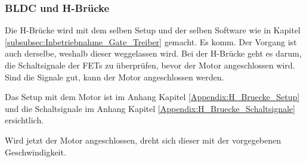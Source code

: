 \subsubsection{BLDC und H-Brücke}
\label{subsubsec:Inbetriebnahme_BLDC_und_H-Brücke}


Die H-Brücke wird mit dem selben Setup und der selben Software wie in Kapitel \ref{subsubsec:Inbetriebnahme_Gate_Treiber} gemacht. Es komm. Der Vorgang ist auch derselbe, weshalb dieser weggelassen wird. Bei der H-Brücke geht es darum, die Schaltsignale der FETs zu überprüfen, bevor der Motor angeschlossen wird. Sind die Signale gut, kann der Motor angeschlossen werden.

Das Setup mit dem Motor ist im Anhang Kapitel \ref{Appendix:H_Bruecke_Setup} und die Schaltsignale im Anhang Kapitel \ref{Appendix:H_Bruecke_Schaltsignale} ersichtlich.

Wird jetzt der Motor angeschlossen, dreht sich dieser mit der vorgegebenen Geschwindigkeit.